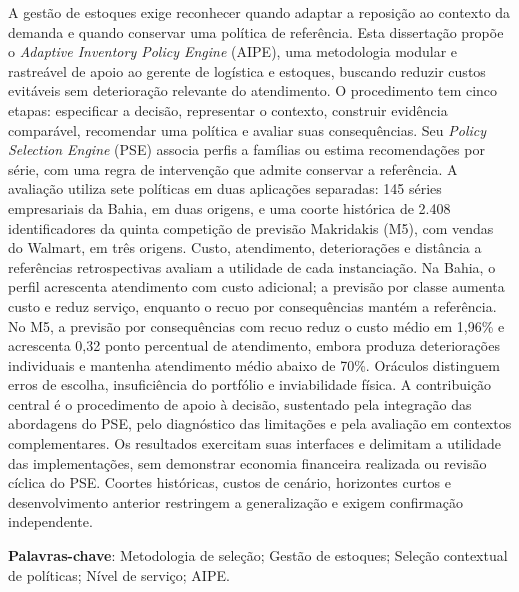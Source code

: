 A gestão de estoques exige reconhecer quando adaptar a reposição ao contexto da demanda e quando conservar uma política de referência. Esta dissertação propõe o \textit{Adaptive Inventory Policy Engine} (AIPE), uma metodologia modular e rastreável de apoio ao gerente de logística e estoques, buscando reduzir custos evitáveis sem deterioração relevante do atendimento. O procedimento tem cinco etapas: especificar a decisão, representar o contexto, construir evidência comparável, recomendar uma política e avaliar suas consequências. Seu \textit{Policy Selection Engine} (PSE) associa perfis a famílias ou estima recomendações por série, com uma regra de intervenção que admite conservar a referência. A avaliação utiliza sete políticas em duas aplicações separadas: 145 séries empresariais da Bahia, em duas origens, e uma coorte histórica de 2.408 identificadores da quinta competição de previsão Makridakis (M5), com vendas do Walmart, em três origens. Custo, atendimento, deteriorações e distância a referências retrospectivas avaliam a utilidade de cada instanciação. Na Bahia, o perfil acrescenta atendimento com custo adicional; a previsão por classe aumenta custo e reduz serviço, enquanto o recuo por consequências mantém a referência. No M5, a previsão por consequências com recuo reduz o custo médio em 1,96\% e acrescenta 0,32 ponto percentual de atendimento, embora produza deteriorações individuais e mantenha atendimento médio abaixo de 70\%. Oráculos distinguem erros de escolha, insuficiência do portfólio e inviabilidade física. A contribuição central é o procedimento de apoio à decisão, sustentado pela integração das abordagens do PSE, pelo diagnóstico das limitações e pela avaliação em contextos complementares. Os resultados exercitam suas interfaces e delimitam a utilidade das implementações, sem demonstrar economia financeira realizada ou revisão cíclica do PSE. Coortes históricas, custos de cenário, horizontes curtos e desenvolvimento anterior restringem a generalização e exigem confirmação independente.

\vspace{2em}
\textbf{Palavras-chave}: Metodologia de seleção; Gestão de estoques; Seleção contextual de políticas; Nível de serviço; AIPE.
